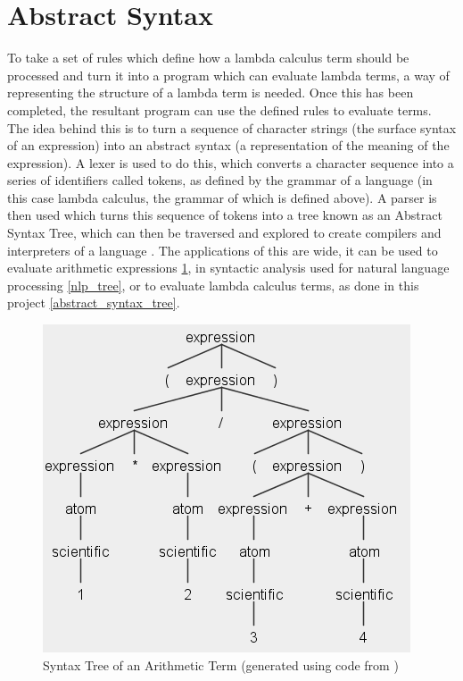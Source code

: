 \documentclass[a4paper,12pt]{report}
\begin{document}
\section{Abstract Syntax}

To take a set of rules which define how a lambda calculus term should be processed and turn it into a program which can evaluate lambda terms, a way of representing the structure of a lambda term is needed. Once this has been completed, the resultant program can use the defined rules to evaluate terms.\\

The idea behind this is to turn a sequence of character strings (the surface syntax of an expression) into an abstract syntax (a representation of the meaning of the expression). A lexer is used to do this, which converts a character sequence into a series of identifiers called tokens, as defined by the grammar of a language (in this case lambda calculus, the grammar of which is defined above). A parser is then used which turns this sequence of tokens into a tree known as an Abstract Syntax Tree, which can then be traversed and explored to create compilers and interpreters of a language \cite{Pierce2002}. The applications of this are wide, it can be used to evaluate arithmetic expressions \ref{arithmetic_syntax_tree}, in syntactic analysis used for natural language processing \cite{Bird2009} \ref{nlp_tree}, or to evaluate lambda calculus terms, as done in this project \ref{abstract_syntax_tree}.

\begin{figure}[p]
	\centering
	\includegraphics[scale=0.75]{images/arithmetic_syntax_tree}
	\caption{Syntax Tree of an Arithmetic Term (generated using code from \protect\cite{Everett2019})}
	\label{arithmetic_syntax_tree}
\end{figure}
\end{document}
